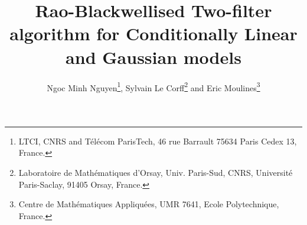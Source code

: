 


\title{Rao-Blackwellised Two-filter algorithm for Conditionally Linear and Gaussian models}
\date{}

\author{Ngoc Minh Nguyen\footnote{LTCI, CNRS and T\'el\'ecom ParisTech, 46 rue Barrault 75634 Paris Cedex 13, France.}, Sylvain {L}e {C}orff\footnote{Laboratoire de Math\'ematiques d'Orsay, Univ. Paris-Sud, CNRS, Universit\'e Paris-Saclay, 91405 Orsay, France.} and Eric Moulines\footnote{Centre de Math\'ematiques Appliqu\'ees, UMR 7641, Ecole Polytechnique, France.}}


\maketitle

